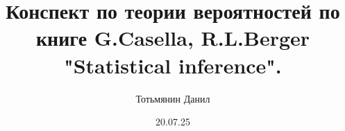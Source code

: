 \documentclass[12pt, a4paper, oneside]{memoir}
\title{Конспект по теории вероятностей по книге G.Casella, R.L.Berger "Statistical inference".}
\author{Тотьмянин Данил}
\date{20.07.25}
\begin{document}
\begin{titlingpage}
    \maketitle
\end{titlingpage}


\tableofcontents


\end{document}
